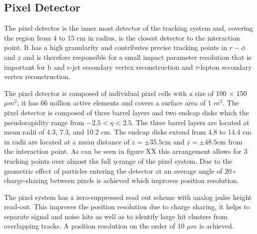 \documentclass[oneside, letterpaper, 12pt, oldfontcommands]{memoir}
\begin{document}
\subsection{Pixel Detector}%
The pixel detector is the inner most detector of the tracking system and, %
covering the region from 4 to 15 cm in radius, is the closest detector to 
the interaction point. It has a high granularity and contributes precise 
tracking points in $r-\phi$ and $z$ and is therefore responsible for a small impact 
parameter resolution that is important for b and c-jet secondary
vertex reconstruction and $\tau$-lepton secondary vertex reconstruction.

The pixel detector is composed of individual pixel cells with a size of 
100 $\times$ 150 $\mu m^{2}$; it has 66 million active elements and covers
a surface area of 1 $m^{2}$. The pixel detector is composed of three barrel 
layers and two endcap disks which the pseudorapidity range from $-2.5<\eta<2.5$.
The three barrel layers are located at mean radii of 4.3, 7.3, and 10.2 cm. 
The endcap disks extend from 4.8 to 14.4 cm in radii are located at a mean distance
of $z=\pm35.5$cm and $z=\pm48.5$cm from the interaction point. 
As can be seen in figure XX this arrangement allows for 3 tracking points over %
almost the full $\eta$-range of the pixel system. Due to the geometric effect 
of particles entering the detector at an average angle of $20\circ$%
charge-sharing between pixels is achieved which improves position resolution.

The pixel system has a zero-suppressed read out scheme with analog pulse
height read-out. This improves the position resolution due to charge sharing,
it helps to separate signal and noise hits as well as to identify large hit 
clusters from overlapping tracks.
A position resolution on the order of 10 $\mu m$ is achieved.
\end{document}
